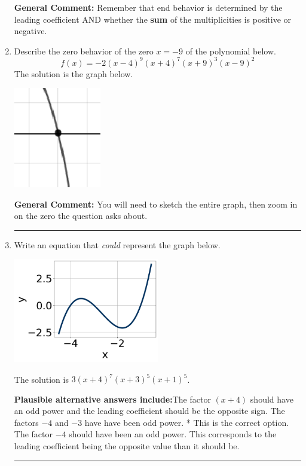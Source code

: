 \documentclass{extbook}[14pt]
\newcommand{\litem}[1]{\item #1

\rule{\textwidth}{0.4pt}}
\begin{document}
\begin{enumerate}
{\textbf{General Comment:} Remember that end behavior is determined by the leading coefficient AND whether the \textbf{sum} of the multiplicities is positive or negative.
}
\litem{
Describe the zero behavior of the zero $x = -9$ of the polynomial below.
\[ f(x) = -2(x - 4)^{9}(x + 4)^{7}(x + 9)^{3}(x - 9)^{2} \]The solution is the graph below.
    \begin{center}
        \includegraphics[width=0.3\textwidth]{../Figures/polyZeroBehaviorAC.png}
    \end{center}

\textbf{General Comment:} You will need to sketch the entire graph, then zoom in on the zero the question asks about.
}
\litem{
Write an equation that \textit{could} represent the graph below.

\begin{center}
    \includegraphics[width=0.5\textwidth]{../Figures/polyGraphToFunctionC.png}
\end{center}


The solution is \( 3(x + 4)^{7} (x + 3)^{5} (x + 1)^{5} \).\begin{enumerate}[label=\Alph*.]
\textbf{Plausible alternative answers include:}The factor $(x + 4)$ should have an odd power and the leading coefficient should be the opposite sign.
The factors $-4$ and $-3$ have have been odd power.
* This is the correct option.
The factor $-4$ should have been an odd power.
This corresponds to the leading coefficient being the opposite value than it should be.
\end{enumerate}

}
\end{enumerate}
\end{document}
